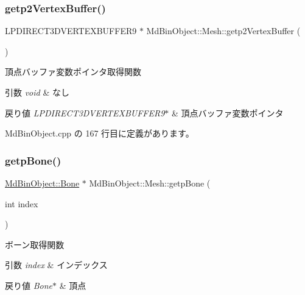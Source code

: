 \subsubsection{\texorpdfstring{getp2\+Vertex\+Buffer()}{getp2VertexBuffer()}}
{\footnotesize\ttfamily L\+P\+D\+I\+R\+E\+C\+T3\+D\+V\+E\+R\+T\+E\+X\+B\+U\+F\+F\+E\+R9 $\ast$ Md\+Bin\+Object\+::\+Mesh\+::getp2\+Vertex\+Buffer (\begin{DoxyParamCaption}{ }\end{DoxyParamCaption})}



頂点バッファ変数ポインタ取得関数 


\begin{DoxyParams}{引数}
{\em void} & なし \\
\hline
\end{DoxyParams}

\begin{DoxyRetVals}{戻り値}
{\em L\+P\+D\+I\+R\+E\+C\+T3\+D\+V\+E\+R\+T\+E\+X\+B\+U\+F\+F\+E\+R9$\ast$} & 頂点バッファ変数ポインタ \\
\hline
\end{DoxyRetVals}


 Md\+Bin\+Object.\+cpp の 167 行目に定義があります。

\mbox{\label{class_md_bin_object_1_1_mesh_ad7cac05848e94675d9f87c85a60aab86}} 
\subsubsection{\texorpdfstring{getp\+Bone()}{getpBone()}}
{\footnotesize\ttfamily \mbox{\hyperlink{class_md_bin_object_1_1_bone}{Md\+Bin\+Object\+::\+Bone}} $\ast$ Md\+Bin\+Object\+::\+Mesh\+::getp\+Bone (\begin{DoxyParamCaption}\item[{int}]{index }\end{DoxyParamCaption})}



ボーン取得関数 


\begin{DoxyParams}{引数}
{\em index} & インデックス \\
\hline
\end{DoxyParams}

\begin{DoxyRetVals}{戻り値}
{\em Bone$\ast$} & 頂点 \\
\hline
\end{DoxyRetVals}


